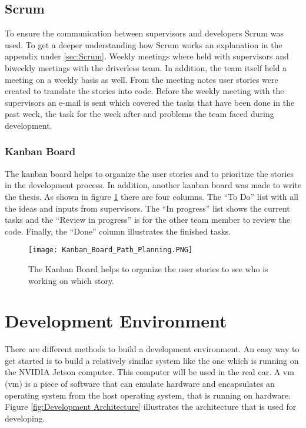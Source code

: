\subsection{Scrum} \label{sec:Planning Method: Scrum}
To ensure the communication between supervisors and developers Scrum was used. To get a deeper understanding how Scrum works an explanation in the appendix under \ref{sec:Scrum}. Weekly meetings where held with supervisors and biweekly meetings with the driverless team. In addition, the team itself held a meeting on a weekly basis as well. From the meeting notes user stories were created to translate the stories into code. Before the weekly meeting with the supervisors an e-mail is sent which covered the tasks that have been done in the past week, the task for the week after and problems the team faced during development.

\subsubsection{Kanban Board} \label{sec:Kanban Board}
The kanban board helps to organize the user stories and to prioritize the stories in the development process. In addition, another kanban board was made to write the thesis. As shown in figure \ref{fig:Kanban Board Path Planning} there are four columns. The ``To Do'' list with all the ideas and inputs from supervisors. The ``In progress'' list shows the current tasks and the ``Review in progress'' is for the other team member to review the code. Finally, the ``Done'' column illustrates the finished tasks.
\begin{figure}[H]
    \centering
    \texttt{[image: Kanban\_Board\_Path\_Planning.PNG]}
    \caption{The Kanban Board helps to organize the user stories to see who is working on which story.}
    \label{fig:Kanban Board Path Planning}
\end{figure}

\section{Development Environment} \label{sec:Development Environment}

There are different methods to build a development environment. An easy way to get started is to build a relatively similar system like the one which is running on the NVIDIA Jetson computer. This computer will be used in the real car. A \acrlong{vm} (\acrshort{vm}) is a piece of software that can emulate hardware and encapsulates an operating system from the host operating system, that is running on hardware. Figure \ref{fig:Development Architecture} illustrates the architecture that is used for developing.

